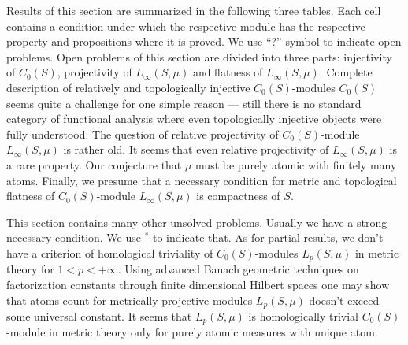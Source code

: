 Results of this section are summarized in the following three tables. Each cell
contains a condition under which the respective module has the respective
property and propositions where it is proved. We use ``?'' symbol to indicate 
open problems. Open problems of this section are divided into three parts:
injectivity of $C_0(S)$, projectivity of $L_\infty(S,\mu)$ and flatness of
$L_\infty(S,\mu)$. Complete description of relatively and topologically
injective $C_0(S)$-modules $C_0(S)$ seems quite a challenge for one simple
reason --- still there is no standard category of functional analysis where even
topologically injective objects were fully understood. The question of relative
projectivity of $C_0(S)$-module $L_\infty(S,\mu)$ is rather old. It seems that
even relative projectivity of $L_\infty(S,\mu)$ is a rare property. Our
conjecture that $\mu$ must be purely atomic with finitely many atoms. Finally, we
presume that a necessary condition for metric and topological flatness of
$C_0(S)$-module $L_\infty(S,\mu)$ is compactness of $S$.

This section contains many other unsolved problems. Usually we have a strong
necessary condition. We use ${}^{*}$ to indicate that. As for partial results, 
we don't have a criterion of homological triviality of $C_0(S)$-modules 
$L_p(S,\mu)$ in metric theory for $1<p<+\infty$. Using advanced
Banach geometric techniques on factorization constants through finite
dimensional Hilbert spaces one may show that atoms count for metrically
projective modules $L_p(S,\mu)$ doesn't exceed some universal constant. It seems
that $L_p(S,\mu)$ is homologically trivial $C_0(S)$-module in metric theory only
for purely atomic measures with unique atom. 


